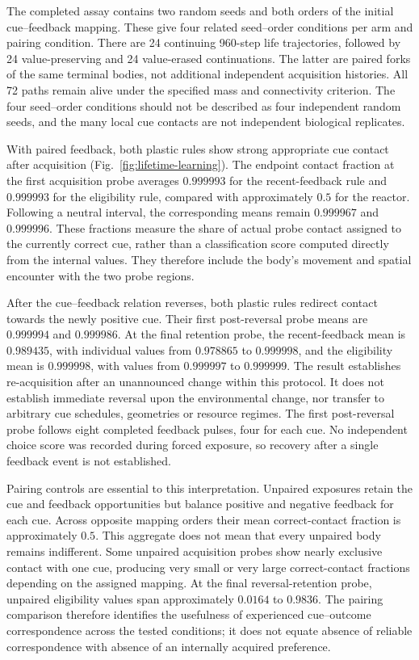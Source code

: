 The completed assay contains two random seeds and both orders of the initial cue--feedback mapping. These give four related seed--order conditions per arm and pairing condition. There are 24 continuing 960-step life trajectories, followed by 24 value-preserving and 24 value-erased continuations. The latter are paired forks of the same terminal bodies, not additional independent acquisition histories. All 72 paths remain alive under the specified mass and connectivity criterion. The four seed--order conditions should not be described as four independent random seeds, and the many local cue contacts are not independent biological replicates.

With paired feedback, both plastic rules show strong appropriate cue contact after acquisition (Fig.~\ref{fig:lifetime-learning}). The endpoint contact fraction at the first acquisition probe averages $0.999993$ for the recent-feedback rule and $0.999993$ for the eligibility rule, compared with approximately $0.5$ for the reactor. Following a neutral interval, the corresponding means remain $0.999967$ and $0.999996$. These fractions measure the share of actual probe contact assigned to the currently correct cue, rather than a classification score computed directly from the internal values. They therefore include the body's movement and spatial encounter with the two probe regions.

After the cue--feedback relation reverses, both plastic rules redirect contact towards the newly positive cue. Their first post-reversal probe means are $0.999994$ and $0.999986$. At the final retention probe, the recent-feedback mean is $0.989435$, with individual values from $0.978865$ to $0.999998$, and the eligibility mean is $0.999998$, with values from $0.999997$ to $0.999999$. The result establishes re-acquisition after an unannounced change within this protocol. It does not establish immediate reversal upon the environmental change, nor transfer to arbitrary cue schedules, geometries or resource regimes. The first post-reversal probe follows eight completed feedback pulses, four for each cue. No independent choice score was recorded during forced exposure, so recovery after a single feedback event is not established.

Pairing controls are essential to this interpretation. Unpaired exposures retain the cue and feedback opportunities but balance positive and negative feedback for each cue. Across opposite mapping orders their mean correct-contact fraction is approximately $0.5$. This aggregate does not mean that every unpaired body remains indifferent. Some unpaired acquisition probes show nearly exclusive contact with one cue, producing very small or very large correct-contact fractions depending on the assigned mapping. At the final reversal-retention probe, unpaired eligibility values span approximately $0.0164$ to $0.9836$. The pairing comparison therefore identifies the usefulness of experienced cue--outcome correspondence across the tested conditions; it does not equate absence of reliable correspondence with absence of an internally acquired preference.


